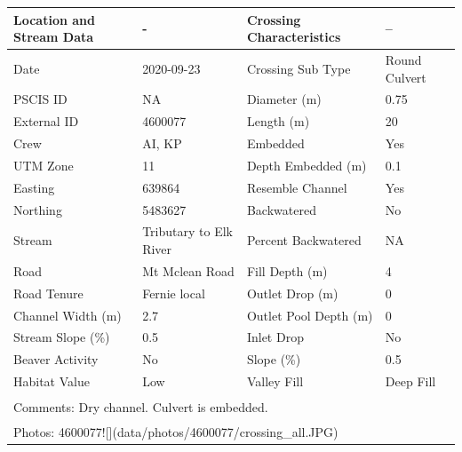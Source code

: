 \documentclass[
]{book}
\begin{document}
\begin{tabular}{l|l|l|l}
\hline
Location and Stream Data & - & Crossing Characteristics & --\\
\hline
Date & 2020-09-23 & Crossing Sub Type & Round Culvert\\
\hline
PSCIS ID & NA & Diameter (m) & 0.75\\
\hline
External ID & 4600077 & Length (m) & 20\\
\hline
Crew & AI, KP & Embedded & Yes\\
\hline
UTM Zone & 11 & Depth Embedded (m) & 0.1\\
\hline
Easting & 639864 & Resemble Channel & Yes\\
\hline
Northing & 5483627 & Backwatered & No\\
\hline
Stream & Tributary to Elk River & Percent Backwatered & NA\\
\hline
Road & Mt Mclean Road & Fill Depth (m) & 4\\
\hline
Road Tenure & Fernie local & Outlet Drop (m) & 0\\
\hline
Channel Width (m) & 2.7 & Outlet Pool Depth (m) & 0\\
\hline
Stream Slope (\%) & 0.5 & Inlet Drop & No\\
\hline
Beaver Activity & No & Slope (\%) & 0.5\\
\hline
Habitat Value & Low & Valley Fill & Deep Fill\\
\hline
\multicolumn{4}{l}{\textsuperscript{} Comments: Dry channel. Culvert is embedded.}\\
\multicolumn{4}{l}{\textsuperscript{} Photos: 4600077![](data/photos/4600077/crossing\_all.JPG)}\\
\end{tabular}
\end{document}
